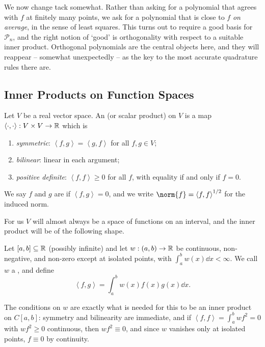 \documentclass[a4paper]{scrartcl}
\newcommand{\ip}[2]{\left\langle #1, #2 \right\rangle}
\newcommand{\Pn}[1]{\mathcal{P}_{#1}}
\begin{document}
We now change tack somewhat. Rather than asking for a polynomial that agrees with $f$ at finitely many points, we ask for a polynomial that is close to $f$ \emph{on average}, in the sense of least squares. This turns out to require a good basis for $\Pn{n}$, and the right notion of `good' is orthogonality with respect to a suitable inner product. Orthogonal polynomials are the central objects here, and they will reappear -- somewhat unexpectedly -- as the key to the most accurate quadrature rules there are.

\subsection{Inner Products on Function Spaces}

\begin{definition}
  Let $V$ be a real vector space. An  (or scalar product) on $V$ is a map $\ip{\cdot}{\cdot}: V \times V \to \R$ which is
  \begin{enumerate}[label=(\roman*)]
    \item \emph{symmetric}: $\ip{f}{g} = \ip{g}{f}$ for all $f, g \in V$;
    \item \emph{bilinear}: linear in each argument;
    \item \emph{positive definite}: $\ip{f}{f} \geq 0$ for all $f$, with equality if and only if $f = 0$.
  \end{enumerate}
  We say $f$ and $g$ are  if $\ip{f}{g} = 0$, and we write $\norm{f} = \ip{f}{f}^{1/2}$ for the induced norm.
\end{definition}

For us $V$ will almost always be a space of functions on an interval, and the inner product will be of the following shape.

\begin{definition}
  Let $[a,b] \subseteq \mathbb{R}$ (possibly infinite) and let $w : (a,b) \to \mathbb{R}$ be continuous, non-negative, and non-zero except at isolated points, with $\int_a^b w(x)\dd x < \infty$. We call $w$ a , and define
  $$
  \ip{f}{g} = \int_a^b w(x)f(x)g(x)\dd x.
  $$
\end{definition}

The conditions on $w$ are exactly what is needed for this to be an inner product on $C[a,b]$: symmetry and bilinearity are immediate, and if $\ip{f}{f} = \int_a^b w f^2 = 0$ with $wf^2 \geq 0$ continuous, then $wf^2 \equiv 0$, and since $w$ vanishes only at isolated points, $f \equiv 0$ by continuity.
\end{document}
